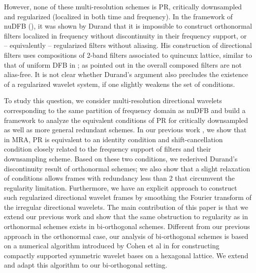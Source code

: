 However, none of these multi-resolution schemes is PR, critically downsampled and regularized (localized in both time and frequency). In the framework of nuDFB (\cite{nuDFB05}), it was shown by Durand \cite{durand2007} that it is impossible to construct orthonormal filters localized in frequency without discontinuity in their frequency support, or -- equivalently -- regularized filters without aliasing. His construction of directional filters uses compositions of 2-band filters associated to quincunx lattice, similar to that of uniform DFB in \cite{nuDFB05}; as pointed out in \cite{nuDFB05} the overall composed filters are not alias-free. It is not clear whether Durand's argument also precludes the existence of a regularized wavelet system, if one slightly weakens the set of conditions.

To study this question, we consider multi-resolution directional wavelets corresponding to the same partition of frequency domain as nuDFB and build a framework to analyze the equivalent conditions of PR for critically downsampled as well as more general redundant schemes. In our previous work \cite{yin2014orthshear}, we show that in MRA, PR is equivalent to an identity condition and shift-cancellation condition closely related to the frequency support of filters and their downsampling scheme. Based on these two conditions, we rederived Durand's discontinuity result of orthonormal schemes; we also show that a slight relaxation of conditions allows frames with redundancy less than 2 that circumvent the regularity limitation. Furthermore, we have an explicit approach to construct such regularized directional wavelet frames by smoothing the Fourier transform of the irregular directional wavelets.
The main contribution of this paper is that we extend our previous work and show that the same obstruction to regularity as in orthonormal schemes exists in bi-orthogonal schemes. Different from our previous approach in the orthonormal case, our analysis of bi-orthogonal schemes is based on a numerical algorithm introduced by Cohen et al in \cite{cohen1993compactly} for constructing compactly supported symmetric wavelet bases on a hexagonal lattice. We extend and adapt this algorithm to our bi-orthogonal setting.

